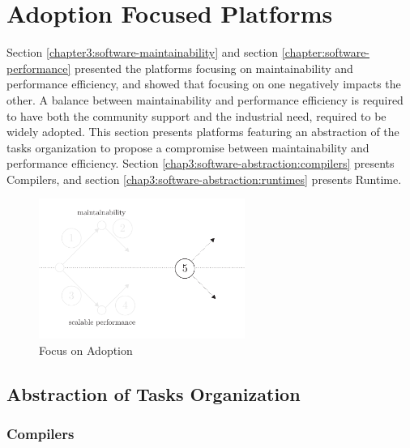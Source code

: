 \section{Adoption Focused Platforms} \label{chapter3:software-abstraction}

Section \ref{chapter3:software-maintainability} and section \ref{chapter:software-performance} presented the platforms focusing on maintainability and performance efficiency, and showed that focusing on one negatively impacts the other.
A balance between maintainability and performance efficiency is required to have both the community support and the industrial need, required to be widely adopted.
This section presents platforms featuring an abstraction of the tasks organization to propose a compromise between maintainability and performance efficiency.
Section \ref{chap3:software-abstraction:compilers} presents Compilers, and section \ref{chap3:software-abstraction:runtimes} presents Runtime.


\begin{figure}[!h]
\begin{center}
\includegraphics[width=0.6\textwidth]{../ressources/state-of-the-art-5.pdf}
\end{center}
\caption{Focus on Adoption}
\label{fig:state-of-the-art-5}
\end{figure}

\subsection{Abstraction of Tasks Organization}

\subsubsection{Compilers} \label{chapter3:software-abstraction:compilers}

